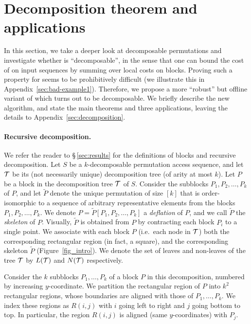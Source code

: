 \section{Decomposition theorem and applications}
\label{sec:dec-short}
In this section, we take a deeper look at decomposable permutations and investigate whether \greedy is ``decomposable'', in the sense that one can bound the cost of \greedy on input sequences by summing over local costs on blocks. Proving such a property for \greedy seems to be prohibitively difficult (we illustrate this in Appendix~\ref{sec:bad-example1}). Therefore, we propose a more ``robust'' but offline variant of \greedy which turns out to be decomposable. We briefly describe the new algorithm, and state the main theorems and three applications, leaving the details to Appendix~\ref{sec:decomposition}. 

\vspace{-0.06in}
\paragraph*{Recursive decomposition.}


We refer the reader to \S\,\ref{sec:results} for the definitions of blocks and recursive decomposition. Let $S$ be a $k$-decomposable permutation access sequence, and let ${\mathcal T}$ be its (not necessarily unique) decomposition tree (of arity at most $k$).
Let $P$ be a block in the decomposition tree ${\mathcal T}$ of $S$. Consider the subblocks $P_1, P_2, \dots, P_k$ of $P$, and let $\tilde{P}$ denote the unique permutation of size $[k]$ that is order-isomorphic to a sequence of arbitrary representative elements from the blocks $P_1, P_2, \dots, P_k$. We denote $P = \tilde{P}[P_1, P_2, \dots, P_k]$ a \emph{deflation} of $P$, and we call $\tilde{P}$ the \emph{skeleton} of $P$. Visually, $\tilde{P}$ is obtained from $P$ by contracting each block $P_i$ to a single point. We associate with each block $P$ (i.e.\ each node in ${\mathcal T}$) both the corresponding rectangular region (in fact, a square), and the corresponding skeleton $\tilde{P}$ (Figure~\ref{fig_intro}). We denote the set of leaves and non-leaves of the tree ${\mathcal T}$ by $L({\mathcal T})$ and $N({\mathcal T})$ respectively. %

Consider the $k$ subblocks $P_1,\ldots,P_k$ of a block $P$ in this decomposition, numbered by increasing $y$-coordinate. We partition the rectangular region of $P$ into $k^2$ rectangular regions, whose boundaries are aligned with those of $P_1,\ldots,P_k$. We index these regions as $R(i,j)$ with $i$ going left to right and $j$ going bottom to top. In particular, the region $R(i,j)$ is aligned (same $y$-coordinates) with $P_j$. 


